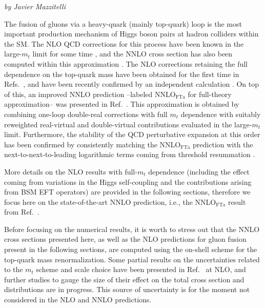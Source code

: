 \label{sec:HH_NNLO}
\begin{center}
    \textit{by Javier Mazzitelli}
\end{center}

The fusion of gluons via a heavy-quark (mainly top-quark) loop is the most important production mechanism of Higgs boson pairs at hadron colliders within the SM.
The NLO QCD corrections for this process have been known in the large-$m_t$ limit for some time \cite{Dawson:1998py}, and the NNLO cross section has also been computed within this approximation \cite{deFlorian:2013jea}.
The NLO corrections retaining the full dependence on the top-quark mass have been obtained for the first time in Refs.~\cite{Borowka:2016ehy,Borowka:2016ypz}, and have been recently confirmed by an independent calculation \cite{Baglio:2018lrj}.
On top of this, an improved NNLO prediction --labeled NNLO$_{\mathrm{FTa}}$ for full-theory approximation-- was presented in Ref.~\cite{Grazzini:2018bsd}.
This approximation is obtained by combining one-loop double-real corrections with full $m_t$ dependence with suitably reweighted real-virtual and double-virtual contributions evaluated in the large-$m_t$ limit.
Furthermore, the stability of the QCD perturbative expansion at this order has been confirmed by consistently matching the NNLO$_{\mathrm{FTa}}$ prediction with the next-to-next-to-leading logarithmic terms coming from threshold resummation \cite{deFlorian:2018tah}.

More details on the NLO results with full-$m_t$ dependence (including the effect coming from variations in the Higgs self-coupling and the contributions arising from BSM EFT operators) are provided in the following sections, therefore we focus here on the state-of-the-art NNLO prediction, i.e., the NNLO$_{\mathrm{FTa}}$ result from Ref.~\cite{Grazzini:2018bsd}.

Before focusing on the numerical results, it is worth to stress out that the NNLO cross sections presented here, as well as the NLO predictions for gluon fusion present in the following sections, are computed using the on-shell scheme for the top-quark mass renormalization.
Some partial results on the uncertainties related to the $m_t$ scheme and scale choice have been presented in Ref.~\cite{Baglio:2018lrj} at NLO, and further studies to gauge the size of their effect on the total cross section and distributions are in progress.
This source of uncertainty is for the moment not considered in the NLO and NNLO predictions.

